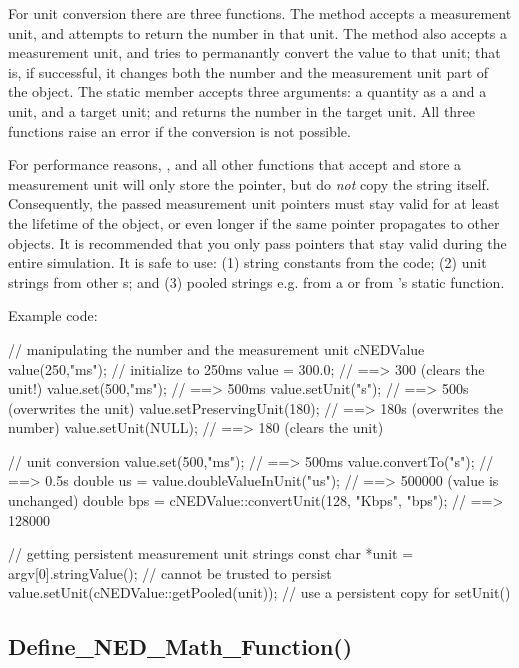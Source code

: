 For unit conversion there are three functions. The
 method accepts a measurement unit, and attempts
to return the number in that unit. The  method also
accepts a measurement unit, and tries to permanantly convert the value to
that unit; that is, if successful, it changes both the number and the
measurement unit part of the object. The  static
 member accepts three arguments: a quantity as a
 and a unit, and a target unit; and returns the number in the
target unit. All three functions raise an error if the conversion is not
possible.

For performance reasons, ,  and all other
functions that accept and store a measurement unit will only store the
 pointer, but do \textit{not} copy the string itself.
Consequently, the passed measurement unit pointers must stay valid for at
least the lifetime of the  object, or even longer if the
same pointer propagates to other  objects. It is
recommended that you only pass pointers that stay valid during the entire
simulation. It is safe to use: (1) string constants from the code; (2) unit
strings from other s; and (3) pooled strings e.g. from a
 or from 's static 
function.

Example code:

\begin{cpp}
// manipulating the number and the measurement unit
cNEDValue value(250,"ms");    // initialize to 250ms
value = 300.0;                // ==> 300 (clears the unit!)
value.set(500,"ms");          // ==> 500ms
value.setUnit("s");           // ==> 500s (overwrites the unit)
value.setPreservingUnit(180); // ==> 180s (overwrites the number)
value.setUnit(NULL);          // ==> 180 (clears the unit)

// unit conversion
value.set(500,"ms");          // ==> 500ms
value.convertTo("s");         // ==> 0.5s
double us = value.doubleValueInUnit("us"); // ==> 500000 (value is unchanged)
double bps = cNEDValue::convertUnit(128, "Kbps", "bps"); // ==> 128000

// getting persistent measurement unit strings
const char *unit = argv[0].stringValue(); // cannot be trusted to persist
value.setUnit(cNEDValue::getPooled(unit)); // use a persistent copy for setUnit()
\end{cpp}


\subsection{Define\_NED\_Math\_Function()}


